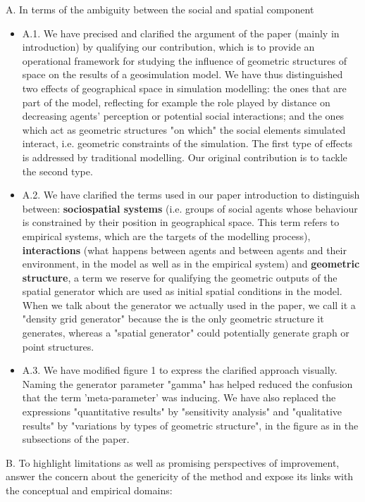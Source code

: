 \documentclass[11pt,a4paper,sans]{moderncv}        %
\begin{document}
 \medskip
A. In terms of the ambiguity between the social and spatial component 
\begin{itemize}
\item A.1. We have precised and clarified the argument of the paper (mainly in introduction) by qualifying our contribution, which is to provide an operational framework for studying the influence of geometric structures of space on the results of a geosimulation model. We have thus distinguished two effects of geographical space in simulation modelling: the ones that are part of the model, reflecting for example the role played by distance on decreasing agents' perception or potential social interactions; and the ones which act as geometric structures "on which" the social elements simulated interact, i.e. geometric constraints of the simulation. The first type of effects is addressed by traditional modelling. Our original contribution is to tackle the second type. 
 
\item A.2. We have clarified the terms used in our paper introduction to distinguish between: {\bf sociospatial systems} (i.e. groups of social agents whose behaviour is constrained by their position in geographical space. This term refers to empirical systems, which are the targets of the modelling process), {\bf interactions} (what happens between agents and between agents and their environment, in the model as well as in the empirical system) and {\bf geometric structure}, a term we reserve for qualifying the geometric outputs of the spatial generator which are used as initial spatial conditions in the model. When we talk about the generator we actually used in the paper, we call it a "density grid generator" because the is the only geometric structure it generates, whereas a "spatial generator" could potentially generate graph or point structures. 


 \item A.3. We have modified figure 1 to express the clarified approach visually. Naming the generator parameter "gamma" has helped reduced the confusion that the term 'meta-parameter' was inducing. We have also replaced the expressions "quantitative results" by "sensitivity analysis" and "qualitative results" by "variations by types of geometric structure", in the figure as in the subsections of the paper. 
\end{itemize}

 \medskip
B. To highlight limitations as well as promising perspectives of improvement, answer the concern about the genericity of the method and expose its links with the conceptual and empirical domains:
\end{document}
